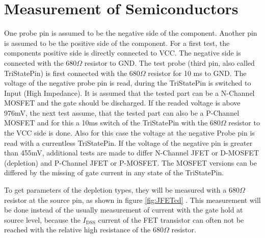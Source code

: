 \section{Measurement of Semiconductors}
One probe pin is assumed to be the negative side of the component.
Another pin is assumed to be the positive side of the component.
For a first test, the components positive side is directly connected to VCC.
The negative side is connected with the \(680\Omega\) resistor to GND.
The test probe (third pin, also called TriStatePin) is first connected with the \(680\Omega\) resistor
for 10 ms to GND. The voltage of the negative probe pin is read, during  the TriStatePin is
switched to Input (High Impedance). It is assumed that the tested part can be
a N-Channel MOSFET and the gate should be discharged.
If the readed voltage is above 976mV, the next test assume, that the tested part can
also be a P-Channel MOSFET and for this a 10ms switch of the TriStatePin with the \(680\Omega\) resistor
to the VCC side is done.
Also for this case the voltage at the negative Probe pin is read with a currentless TriStatePin.
If the voltage of the negative pin is greater than 455mV, additional tests are made to differ
N-Channel JFET or D-MOSFET (depletion) and P-Channel JFET or P-MOSFET. 
The MOSFET versions can be differed by the missing of gate current in any state
of the TriStatePin.

To get parameters of the depletion types, they will be measured with a \(680 \Omega\) resistor at
the source pin, as shown in figure \ref{fig:JFETcd} . This measurement will be done instead of the
usually measurement of current with the gate hold at source level, because
the \(I_\mathrm{DSS}\) current of the FET transistor can often not be reached
with the relative high resistance of the \(680 \Omega\) resistor.

